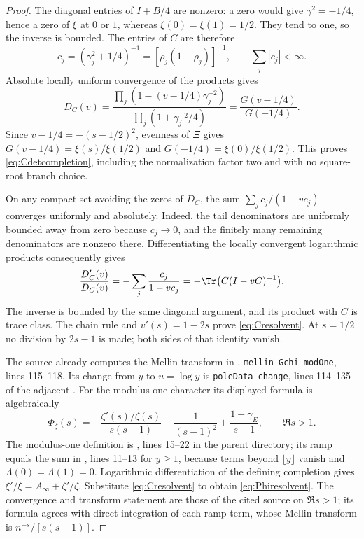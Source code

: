 \begin{proof}
The diagonal entries of $I+B/4$ are nonzero: a zero would give $\gamma^2=-1/4$, hence a zero of $\xi$ at $0$ or $1$, whereas $\xi(0)=\xi(1)=1/2$. They tend to one, so the inverse is bounded. The entries of $C$ are therefore
\[
 c_j=(\gamma_j^2+1/4)^{-1}=[\rho_j(1-\rho_j)]^{-1},
 \qquad \sum_j|c_j|<\infty.
\]
Absolute locally uniform convergence of the products gives
\[
 D_C(v)=\frac{\prod_j(1-(v-1/4)\gamma_j^{-2})}
 {\prod_j(1+\gamma_j^{-2}/4)}
 =\frac{G(v-1/4)}{G(-1/4)}.
\]
Since $v-1/4=-(s-1/2)^2$, evenness of $\Xi$ gives
$G(v-1/4)=\xi(s)/\xi(1/2)$ and
$G(-1/4)=\xi(0)/\xi(1/2)$. This proves \eqref{eq:Cdetcompletion}, including the normalization factor two and with no square-root branch choice.

On any compact set avoiding the zeros of $D_C$, the sum
$\sum_j c_j/(1-vc_j)$ converges uniformly and absolutely. Indeed, the tail denominators are uniformly bounded away from zero because $c_j\to0$, and the finitely many remaining denominators are nonzero there. Differentiating the locally convergent logarithmic products consequently gives
\[
 \frac{D_C'(v)}{D_C(v)}=-\sum_j\frac{c_j}{1-vc_j}
 =-\Tr\bigl(C(I-vC)^{-1}\bigr).
\]
The inverse is bounded by the same diagonal argument, and its product with $C$ is trace class. The chain rule and $v'(s)=1-2s$ prove \eqref{eq:Cresolvent}. At $s=1/2$ no division by $2s-1$ is made; both sides of that identity vanish.

The source already computes the Mellin transform in
,
\texttt{mellin\_Gchi\_modOne}, lines 115--118. Its change from $y$ to $u=\log y$ is
\texttt{poleData\_change}, lines 114--135 of the adjacent .
For the modulus-one character its displayed formula is algebraically
\[
 \Phi_\zeta(s)=-\frac{\zeta'(s)/\zeta(s)}{s(s-1)}
 -\frac1{(s-1)^2}+\frac{1+\gamma_E}{s-1},\qquad \Re s>1.
\]
The modulus-one definition is , lines 15--22 in the parent directory; its ramp equals the sum in , lines 11--13 for $y\ge1$, because terms beyond $\lfloor y\rfloor$ vanish and $\Lambda(0)=\Lambda(1)=0$.
Logarithmic differentiation of the defining completion gives
$\xi'/\xi=A_\infty+\zeta'/\zeta$. Substitute \eqref{eq:Cresolvent} to obtain \eqref{eq:Phiresolvent}. The convergence and transform statement are those of the cited source on $\Re s>1$; its formula agrees with direct integration of each ramp term, whose Mellin transform is $n^{-s}/[s(s-1)]$.
\end{proof}

